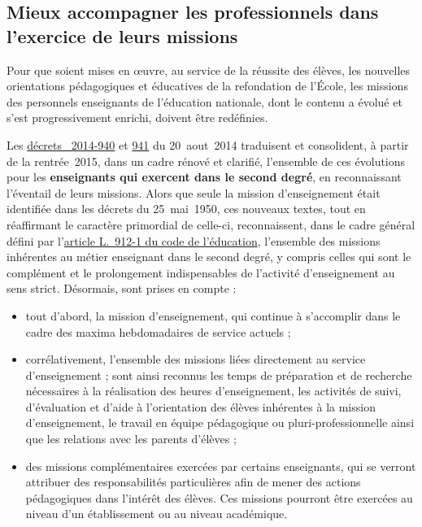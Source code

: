 \subsection{Mieux accompagner les professionnels dans l’exercice de leurs missions}
Pour que soient mises en œuvre, au service de la réussite des élèves, les nouvelles orientations pédagogiques et éducatives de la refondation de l’École, les missions des personnels enseignants de l’éducation nationale, dont le contenu a évolué et s’est progressivement enrichi, doivent être redéfinies.

Les \href{http://legifrance.gouv.fr/affichTexte.do?cidTexte=JORFTEXT000029390906&categorieLien=id}{décrets \no{}~2014-940} et \href{http://www.legifrance.gouv.fr/affichTexte.do?cidTexte=JORFTEXT000029390951&categorieLien=id}{941} du 20~aout~2014 traduisent et consolident, à partir de la rentrée~2015, dans un cadre rénové et clarifié, l’ensemble de ces évolutions pour les \textbf{enseignants qui exercent dans le second degré}, en reconnaissant l’éventail de leurs missions. Alors que seule la mission d’enseignement était identifiée dans les décrets du 25~mai~1950, ces nouveaux textes, tout en réaffirmant le caractère primordial de celle-ci, reconnaissent, dans le cadre général défini par l’\href{http://www.legifrance.gouv.fr/affichCodeArticle.do?cidTexte=LEGITEXT000006071191&idArticle=LEGIARTI000006525568}{article L.~912-1 du code de l’éducation}, l’ensemble des missions inhérentes au métier enseignant dans le second degré, y compris celles qui sont le complément et le prolongement indispensables de l’activité d’enseignement au sens strict. Désormais, sont prises en compte :
\begin{itemize}
\item tout d’abord, la mission d’enseignement, qui continue à s’accomplir dans le cadre des maxima hebdomadaires de service actuels ;
\item corrélativement, l’ensemble des missions liées directement au service d’enseignement ; sont ainsi reconnus les temps de préparation et de recherche nécessaires à la réalisation des heures d’enseignement, les activités de suivi, d’évaluation et d’aide à l’orientation des élèves inhérentes à la mission d’enseignement, le travail en équipe pédagogique ou pluri-professionnelle ainsi que les relations avec les parents d’élèves ;
\item des missions complémentaires exercées par certains enseignants, qui se verront attribuer des responsabilités particulières afin de mener des actions pédagogiques dans l’intérêt des élèves. Ces missions pourront être exercées au niveau d’un établissement ou au niveau académique.
\end{itemize}

